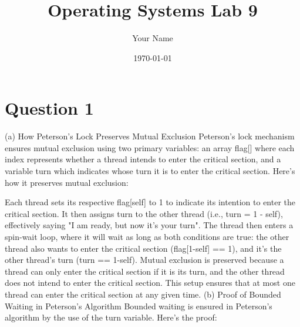 \documentclass{article}
\begin{document}
\title{Operating Systems Lab 9}
\author{Your Name}
\date{\today}

\maketitle

\section{Question 1}
(a) How Peterson’s Lock Preserves Mutual Exclusion
Peterson’s lock mechanism ensures mutual exclusion using two primary variables: an array flag[] where each index represents whether a thread intends to enter the critical section, and a variable turn which indicates whose turn it is to enter the critical section. Here’s how it preserves mutual exclusion:\newline

Each thread sets its respective flag[self] to 1 to indicate its intention to enter the critical section.
It then assigns turn to the other thread (i.e., turn = 1 - self), effectively saying "I am ready, but now it's your turn".
The thread then enters a spin-wait loop, where it will wait as long as both conditions are true: the other thread also wants to enter the critical section (flag[1-self] == 1), and it’s the other thread’s turn (turn == 1-self).
Mutual exclusion is preserved because a thread can only enter the critical section if it is its turn, and the other thread does not intend to enter the critical section. This setup ensures that at most one thread can enter the critical section at any given time.\newline\newline
(b) Proof of Bounded Waiting in Peterson's Algorithm
Bounded waiting is ensured in Peterson’s algorithm by the use of the turn variable. Here’s the proof:\newline
\end{document}
